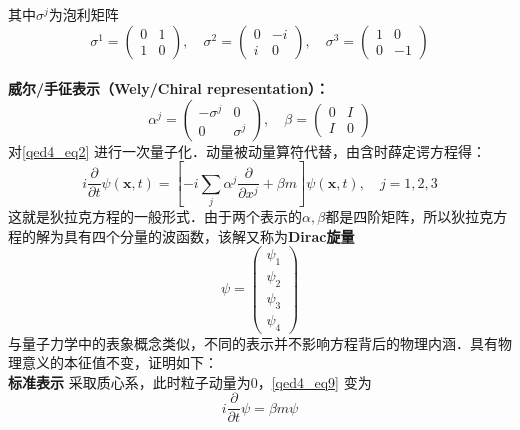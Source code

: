 其中$\sigma^{j}$为泡利矩阵
\begin{equation}\label{qed4_eq7}
\sigma^{1}=\left(\begin{array}{ll}
0 & 1 \\
1 & 0
\end{array}\right), \quad \sigma^{2}=\left(\begin{array}{rr}
0 & -i \\
i & 0
\end{array}\right), \quad \sigma^{3}=\left(\begin{array}{rr}
1 & 0 \\
0 & -1
\end{array}\right)
\end{equation}
\\\textbf{威尔/手征表示（Wely/Chiral representation）：}
\begin{equation}\label{qed4_eq8}
\alpha^{j}=\left(\begin{array}{cc}
-\sigma^{j} & 0 \\
0 & \sigma^{j}
\end{array}\right), \quad \beta=\left(\begin{array}{cc}
0 & I \\
I & 0
\end{array}\right)
\end{equation}
对\autoref{qed4_eq2} 进行一次量子化．动量被动量算符代替，由含时薛定谔方程得：\begin{equation}\label{qed4_eq9}
\boxed{i \frac{\partial}{\partial t} \psi(\boldsymbol{x}, t)=\left[-i \sum_{j} \alpha^{j} \frac{\partial}{\partial x^{j}}+\beta m\right] \psi(\boldsymbol{x}, t), \quad j=1,2,3}
\end{equation}
这就是狄拉克方程的一般形式．由于两个表示的$\alpha,\beta$都是四阶矩阵，所以狄拉克方程的解为具有四个分量的波函数，该解又称为\textbf{Dirac旋量}
\begin{equation}\label{qed4_eq10}
\psi=\left(\begin{array}{l}
\psi_{1} \\
\psi_{2} \\
\psi_{3} \\
\psi_{4}
\end{array}\right)
\end{equation}
与量子力学中的表象概念类似，不同的表示并不影响方程背后的物理内涵．具有物理意义的本征值不变，证明如下：
\\\textbf{标准表示}
采取质心系，此时粒子动量为0，\autoref{qed4_eq9} 变为
\begin{equation}\label{qed4_eq11}
i \frac{\partial}{\partial t} \psi= \beta m\psi
\end{equation}
